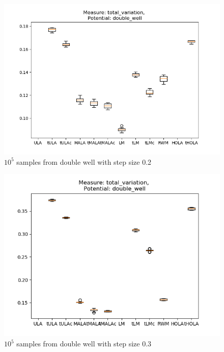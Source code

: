\begin{figure}[ht!]
	\centering
		\includegraphics[height=0.43\textheight]{WriteUp/TV_doublewell_step0pt2.png}
	\caption{$10^5$ samples from double well with step size 0.2}
	\label{fig:TVdouble2}
\end{figure}

\begin{figure}[ht!]
	\centering
		\includegraphics[height=0.43\textheight]{WriteUp/TV_doublewell_step0pt3.png}
	\caption{$10^5$ samples from double well with step size 0.3}
	\label{fig:TVdouble3}
\end{figure}

